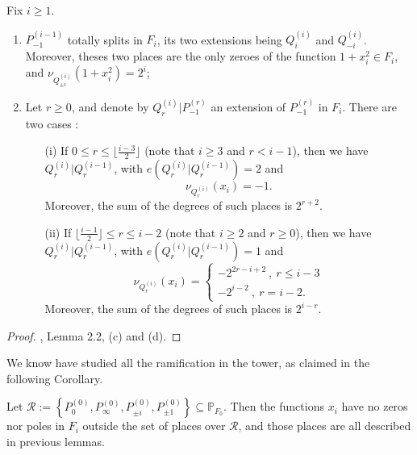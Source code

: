\documentclass[10pt]{article}
\begin{document}
\begin{lemma} \label{ext P moins 1}
Fix $i \geq 1$. 
\begin{enumerate}
\item $P_{-1}^{(i-1)}$ totally splits in $F_i$, its two extensions being $Q_i^{(i)}$ and $Q_{-i}^{(i)}$. Moreover, theses two places are the only zeroes of the function $1+x_i^2 \in F_i$, and $\nu_{Q_{\pm i}^{(i)}}(1+x_i^2) = 2^i$;
\item Let $r \geq 0$, and denote by $Q_r^{(i)}|P_{-1}^{(r)}$ an extension of $P_{-1}^{(r)}$ in $F_i$. There are two cases :
\begin{itemize}
\item[(i)] If $0 \leq r \leq \lfloor \frac{i-3}{2} \rfloor$ (note that $i \geq 3$ and $r<i-1$), then we have $Q_r^{(i)}|Q_r^{(i-1)}$, with $e(Q_r^{(i)}|Q_r^{(i-1)}) =2$ and 
\[\nu_{Q_r^{(i)}}(x_i)=-1.\]  
Moreover, the sum of the degrees of such places is $2^{r+2}$.
\item[(ii)] If $\lfloor \frac{i-1}{2} \rfloor \leq r \leq i-2$ (note that $i \geq 2$ and $r\geq 0$), then we have $Q_r^{(i)}|Q_r^{(i-1)}$, with $e(Q_r^{(i)}|Q_r^{(i-1)}) =1$ and
\begin{equation*}
\nu_{Q_r^{(i)}}(x_i) = \left\{ \begin{array}{ll}
-2^{2r-i+2} \ , \ r \leq i-3 \\
-2^{i-2} \ , \ r =i-2.
\end{array}
\right.
\end{equation*} 
Moreover, the sum of the degrees of such places is $2^{i-r}$.
\end{itemize}
\end{enumerate}
\end{lemma}

\s

\begin{proof}
\cite{NOQ}, Lemma 2.2, (c) and (d).
\end{proof}

\s

We know have studied all the ramification in the tower, as claimed in the following Corollary.

\begin{corollary}
Let $\mathcal{R}:= \left\{P_0^{(0)},P_{\infty}^{(0)},P_{\pm i}^{(0)},P_{\pm 1}^{(0)}\right\} \subseteq \mathbb{P}_{F_0}$. Then the functions $x_i$ have no zeros nor poles in $F_i$ outside the set of places over $\mathcal{R}$, and those places are all described in previous lemmas.
\end{corollary}
\end{document}
